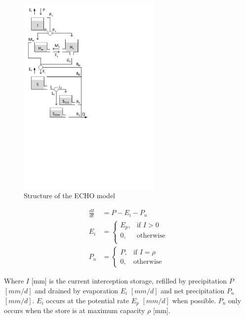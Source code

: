 { 																	%
\begin{figure}
\includegraphics[trim=1cm 11cm 7cm 1cm,width=7cm,keepaspectratio]{./AppA_files/44_schematic.pdf}
\caption{Structure of the ECHO model} \label{fig:44_schematic}
\end{figure}

\begin{align}
	\frac{dI}{dt} &= P-E_i-P_n \\
	E_i &= \begin{cases}
		E_p, &\text{if } I >0 \\
		0, & \text{otherwise} \\
	\end{cases} \\
	P_n &= 
	\begin{cases}
		P, & \text{if } I = \rho \\
		0, & \text{otherwise}
	\end{cases}
\end{align}

Where $I$ [mm] is the current interception storage, refilled by precipitation $P$ $[mm/d]$ and drained by evaporation $E_i$ $[mm/d]$ and net precipitation $P_n$ $[mm/d]$.
$E_i$ occurs at the potential rate $E_p$ $[mm/d]$ when possible. 
$P_n$ only occurs when the store is at maximum capacity $\rho$ [mm].

} %


